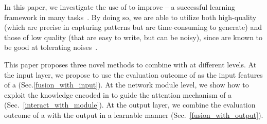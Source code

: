 In this paper, we investigate the use of \REs to improve \NNs -- a successful learning framework in many \NLP
tasks~\cite{goldberg2017neural}. By doing so,
we are able to utilize both high-quality \REs (which are precise in capturing patterns but are time-consuming to generate) and those of low quality (that are easy to write, but can be noisy), %
since \NNs are known to be good at tolerating noises~\cite{xie2016disturblabel}.




This paper proposes three novel methods to combine \REs with \NNs at different levels.  At the input layer, we propose to use the
evaluation outcome of \REs as the input features of a \NN (Sec.\ref{fusion_with_input}).
At the network module level, we show how to
exploit the knowledge encoded in \REs to guide the attention mechanism of a \NN (Sec.~\ref{interact_with_module}). At the output layer, we
combine the evaluation outcome of a \RE with the \NN output in a learnable manner (Sec.~\ref{fusion_with_output}).

